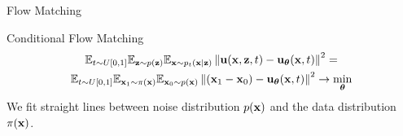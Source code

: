 \begin{frame}{Flow Matching}
	\begin{block}{Conditional Flow Matching}
		\vspace{-0.3cm}
		\begin{multline*}
			\mathbb{E}_{t \sim U[0, 1]} \mathbb{E}_{\mathbf{z} \sim p(\mathbf{z})} \mathbb{E}_{\mathbf{x} \sim p_t(\mathbf{x} | \mathbf{z})}\left\| \mathbf{u}(\mathbf{x}, \mathbf{z}, t) - \mathbf{u}_{\boldsymbol{\theta}}(\mathbf{x}, t) \right\|^2 = \\
			 \mathbb{E}_{t \sim U[0, 1]} \mathbb{E}_{\mathbf{x}_1 \sim \pi(\mathbf{x})} \mathbb{E}_{\mathbf{x}_0 \sim p(\mathbf{x})}\left\| (\mathbf{x}_1 - \mathbf{x}_0) - \mathbf{u}_{\boldsymbol{\theta}}(\mathbf{x}, t) \right\|^2  \rightarrow \min_{\boldsymbol{\theta}}
		\end{multline*}
		We fit straight lines between noise distribution $p(\mathbf{x})$ and the data distribution $\pi(\mathbf{x})$.
		\vspace{-0.3cm}
	\end{block}	
\end{frame}
